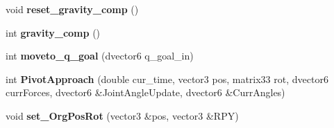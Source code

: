 \begin{DoxyCompactItemize}
\item 
\hypertarget{classhiroArm_aea4777c186d2f7de31439eeadcc2f34d}{void {\bfseries reset\-\_\-gravity\-\_\-comp} ()}\label{classhiroArm_aea4777c186d2f7de31439eeadcc2f34d}

\item 
\hypertarget{classhiroArm_a6a90d46b343f50a5e23a697606f3885d}{int {\bfseries gravity\-\_\-comp} ()}\label{classhiroArm_a6a90d46b343f50a5e23a697606f3885d}

\item 
\hypertarget{classhiroArm_af199c4ebb0f45666641f5ed5fb2cc833}{int {\bfseries moveto\-\_\-q\-\_\-goal} (dvector6 q\-\_\-goal\-\_\-in)}\label{classhiroArm_af199c4ebb0f45666641f5ed5fb2cc833}

\item 
\hypertarget{classhiroArm_af8abb5abd3a346325051b810d81ba4a8}{int {\bfseries Pivot\-Approach} (double cur\-\_\-time, vector3 pos, matrix33 rot, dvector6 curr\-Forces, dvector6 \&Joint\-Angle\-Update, dvector6 \&Curr\-Angles)}\label{classhiroArm_af8abb5abd3a346325051b810d81ba4a8}

\item 
\hypertarget{classhiroArm_a672283bbf662fc98c7034de8e01799d7}{void {\bfseries set\-\_\-\-Org\-Pos\-Rot} (vector3 \&pos, vector3 \&R\-P\-Y)}\label{classhiroArm_a672283bbf662fc98c7034de8e01799d7}

\end{DoxyCompactItemize}
